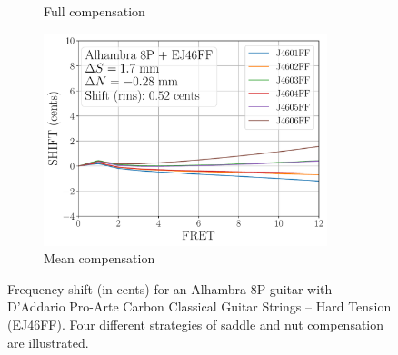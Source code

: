 \begin{figure}
\begin{subfigure}[b]{0.46\textwidth}
    \caption{Full compensation}
    \label{fig:shift_alhambra8p_ej46ff_full}
   \end{subfigure}
   \hspace{0.25in}
   \begin{subfigure}[b]{0.46\textwidth}
    \centering
    \includegraphics[width=3.25in]{../figures/shift_alhambra8p_ej46ff_mean}
    \caption{Mean compensation}
    \label{fig:shift_alhambra8p_ej46ff_mean}
   \end{subfigure}
   \caption{\label{fig:compensation_alhambra8p_ej46ff} Frequency shift (in cents) for an Alhambra 8P guitar with D'Addario Pro-Arte Carbon Classical Guitar Strings -- Hard Tension (EJ46FF). Four different strategies of saddle and nut compensation are illustrated.}
 \end{figure}
 